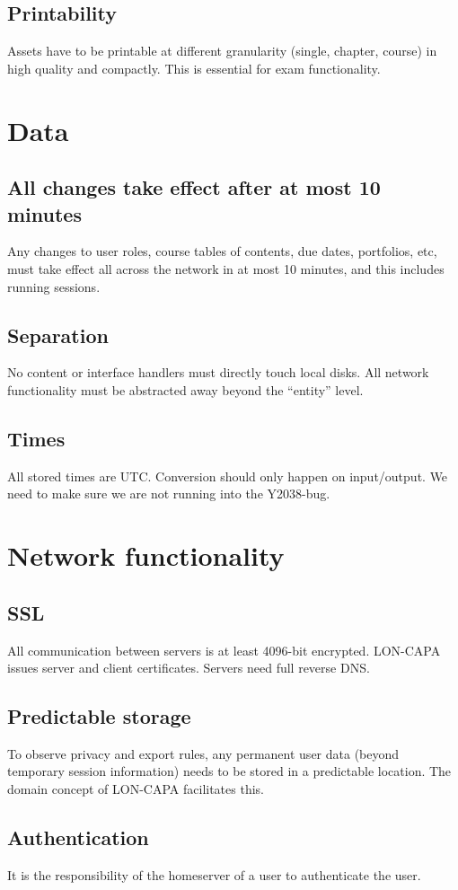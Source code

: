 \subsection{Printability}
Assets have to be printable at different granularity (single, chapter, course) in high quality and compactly. This is essential for exam functionality.
\section{Data}
\subsection{All changes take effect after at most 10 minutes}
Any changes to user roles, course tables of contents, due dates, portfolios, etc, must take effect all across the network in at most 10 minutes, and this includes running sessions.
\subsection{Separation}
No content or interface handlers must directly touch local disks. All network functionality must be abstracted away beyond the ``entity'' level.
\subsection{Times}
All stored times are UTC. Conversion should only happen on input/output. We need to make sure we are not running into the Y2038-bug.
\section{Network functionality}
\subsection{SSL}
All communication between servers is at least 4096-bit encrypted. LON-CAPA issues server and client certificates. Servers need full reverse DNS.
\subsection{Predictable storage}
To observe privacy and export rules, any permanent user data (beyond temporary session information) needs to be stored in a predictable location. The domain concept of LON-CAPA facilitates this.
\subsection{Authentication}
It is the responsibility of the homeserver of a user to authenticate the user.
